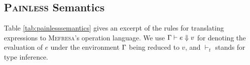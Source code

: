 	\begin{figure}[ht]
	\begin{minipage}[b]{0.35\linewidth} 
	\centering

   

	\end{minipage}
	\hspace{0.25cm}
	\begin{minipage}[b]{0.65\linewidth} 
	\centering
 
	  
 
	\end{minipage}
	\end{figure}	  	


				
		
		
		
		
		
		

\subsection{\textsc{Painless} Semantics}
\label{sub:painlesssemantics}
	
		
	Table \ref{tab:painlesssemantics} gives an excerpt %
	of the rules for translating expressions to \textsc{Mefresa}'s \textsf{operation} language.	
	We use $\Gamma \vdash e \Downarrow v$ for denoting
	the evaluation of $e$ under the environment $\Gamma$ being reduced to $v$, and $\vdash_t$ stands for
	type inference. %


